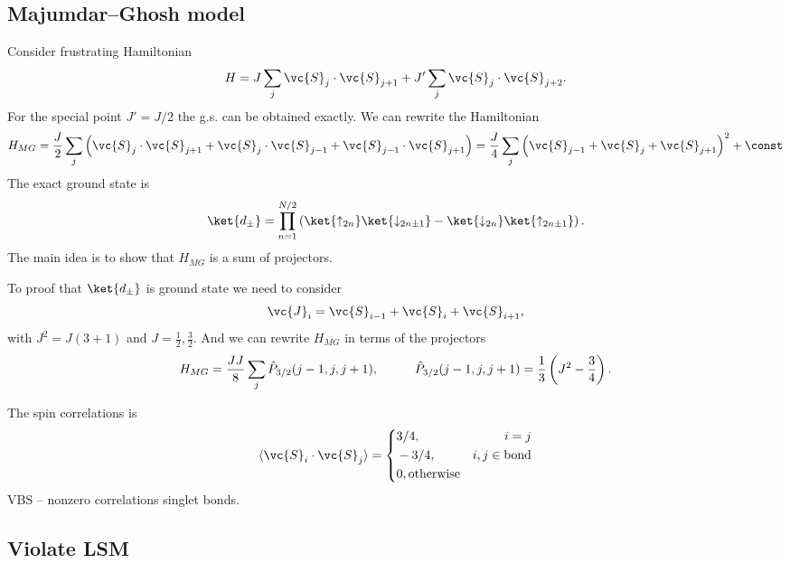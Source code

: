 \subsection*{Majumdar–Ghosh model}


Consider frustrating Hamiltonian
\begin{equation*}
	H = J \sum_j \vc{S}_j \cdot \vc{S}_{j+1} + J' \sum_j \vc{S}_j \cdot \vc{S}_{j+2}.
\end{equation*}
For the special point $J' = J/2$ the g.s. can be obtained exactly. We can rewrite the Hamiltonian
\begin{equation*}
	H_{MG} = \frac{J}{2} \sum_j \left(
		\vc{S}_j \cdot \vc{S}_{j+1} + \vc{S}_{j} \cdot \vc{S}_{j-1} + \vc{S}_{j-1} \cdot \vc{S}_{j+1}
	\right) = \frac{J}{4} \sum_j \left(
		\vc{S}_{j-1} + \vc{S}_j + \vc{S}_{j+1}
	\right)^2 + \const
\end{equation*}
The exact ground state is
\begin{equation*}
	\ket{d_{\pm}} = \prod_{n=1}^{N/2} \left(
		\ket{\uparrow_{2n}} \ket{\downarrow_{2n \pm 1} } - \ket{\downarrow_{2n}} \ket{\uparrow_{2n \pm 1}}
	\right).
\end{equation*}
The main idea is to show that $H_{MG}$ is a sum of projectors.

To proof that $\ket{d_{\pm}}$ is ground state we need to consider
\begin{equation*}
	\vc{J}_i = \vc{S}_{i-1} + \vc{S}_i + \vc{S}_{i+1},
\end{equation*}
with $J^2 = J (3+1)$ and $J = \frac{1}{2}, \frac{3}{2}$. And we can rewrite $H_{MG}$ in terms of the projectors
\begin{equation*}
	H_{MG} = \frac{JJ}{8} \sum_j \hat{P}_{3/2} (j-1,j,j+1),
	\hspace{10 mm} 
	\hat{P}_{3/2}(j-1,j,j+1) = \frac{1}{3}\left(J^2 - \frac{3}{4}\right).
\end{equation*}

The spin correlations is
\begin{equation*}
	\langle \vc{S}_i \cdot \vc{S}_j\rangle = \left\{\begin{aligned}
	    &3/4, &i=j \\
	    &-3/4, &i,j \in \text{bond} \\
	    &0, \text{otherwise}
	\end{aligned}\right.
\end{equation*}
VBS -- nonzero correlations singlet bonds. 




\subsection*{Violate LSM}


